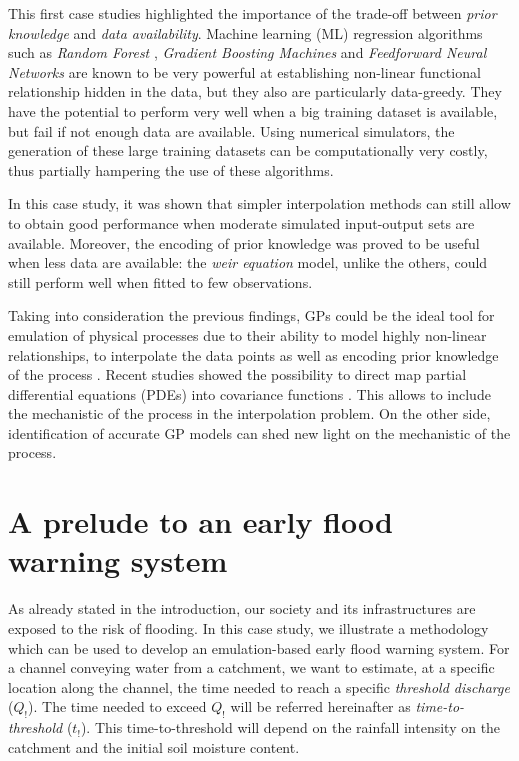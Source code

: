 This first case studies highlighted the importance of the trade-off between \emph{prior knowledge} and \emph{data availability}.
Machine learning (ML) regression algorithms such as \emph{Random Forest} \autocite{breiman_random_2001}, \emph{Gradient Boosting Machines} \autocite{friedman_greedy_2001} and \emph{Feedforward Neural Networks} \autocite{james_introduction_2013} are known to be very powerful at establishing non-linear functional relationship hidden in the data, but they also are particularly data-greedy. They have the potential to perform very well when a big training dataset is available, but fail if not enough data are available. Using numerical simulators, the generation of these large training datasets can be computationally very costly, thus partially hampering the use of these algorithms.

In this case study, it was shown that simpler interpolation methods can still allow to obtain good performance when  moderate simulated input-output sets are available. 
Moreover, the encoding of prior knowledge was proved to be useful when less data are available: the \emph{weir equation} model, unlike the others, could still perform well when fitted to few observations.

Taking into consideration the previous findings, GPs could be the ideal tool for emulation of physical processes due to their ability to model highly non-linear relationships, to interpolate the data points as well as encoding prior knowledge of the process \autocite{rasmussen_gaussian_2010}. Recent studies showed the possibility to direct map partial differential equations (PDEs) into covariance functions \autocite{lindgren_explicit_2011}. This allows to include the mechanistic of the process in the interpolation problem. On the other side, identification of accurate GP models can shed new light on the mechanistic of the process.

\newpage

\section{A prelude to an early flood warning system}
\label{sec:hydrological_emulator}

As already stated in the introduction, our society and its infrastructures are exposed to the risk of flooding.
In this case study, we illustrate a methodology which can be used to develop an emulation-based early flood warning system.
For a channel conveying water from a catchment, we want to estimate, at a specific location along the channel, the time needed to reach a specific \emph{threshold discharge} ($Q_!$). 
The time needed to exceed $Q_!$ will be referred hereinafter as \emph{time-to-threshold} ($t_!$). 
This time-to-threshold will depend on the rainfall intensity on the catchment and the initial soil moisture content.

